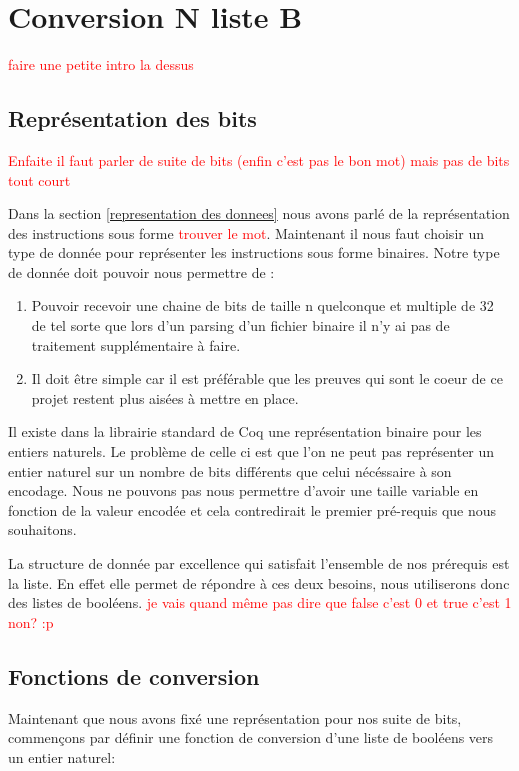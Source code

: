 \documentclass {article}
\newcommand{\codefrom}[3]
           {}
\theoremstyle{definition}
\theoremstyle{remark}
\newcommand{\todo}[1]{\textcolor{red}{#1}}
\begin{document}
\section{Conversion N liste B}

\todo{faire une petite intro la dessus}


\subsection{Représentation des bits}
\todo{Enfaite il faut parler de suite de bits (enfin c'est pas le bon mot) mais pas de bits tout court}

Dans la section \ref{representation des donnees} nous avons parlé de la représentation des instructions
sous forme \todo{trouver le mot}. Maintenant il nous faut choisir un type de donnée pour représenter
les instructions sous forme binaires.
Notre type de donnée doit pouvoir nous permettre de :
\begin{enumerate}
\item Pouvoir recevoir une chaine de bits de taille n quelconque et multiple de 32 de tel sorte que
  lors d'un parsing d'un fichier binaire il n'y ai pas de traitement supplémentaire à faire.
\item Il doit être simple car il est préférable que les preuves qui sont le coeur de ce projet restent
  plus aisées à mettre en place.
\end{enumerate}

Il existe dans la librairie standard de Coq une représentation binaire pour les entiers naturels.
Le problème de celle ci est que l'on ne peut pas représenter un entier naturel sur un nombre de bits différents
que celui nécéssaire à son encodage. Nous ne pouvons pas nous permettre d'avoir une taille variable en
fonction de la valeur encodée et cela contredirait le premier pré-requis que nous souhaitons.

La structure de donnée par excellence qui satisfait l'ensemble de nos prérequis est la liste.
En effet elle permet de répondre à ces deux besoins, nous utiliserons donc des listes de booléens.
\todo{je vais quand même pas dire que false c'est 0 et true c'est 1 non? :p}

\codefrom{src}{ast_instructions}{binary_instruction}




\subsection{Fonctions de conversion}
\label{Fonctions de conversion}
Maintenant que nous avons fixé une représentation pour nos suite de bits, commençons par définir
une fonction de conversion d'une liste de booléens vers un entier naturel:
\end{document}
